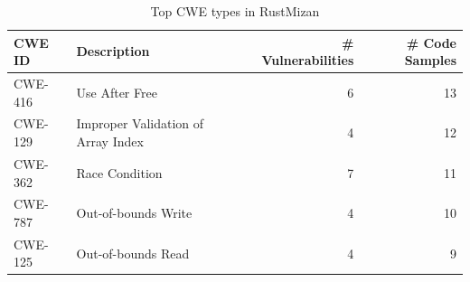 \begin{table}[htbp]
\centering
\footnotesize
\caption{Top CWE types in RustMizan}
\label{tab:cwe_distribution}
\begin{tabular}{@{}llrr@{}}
\toprule
\textbf{CWE ID} & \textbf{Description} & \textbf{\# Vulnerabilities} & \textbf{\# Code Samples} \\
\midrule
CWE-416 & Use After Free & 6 & 13 \\
CWE-129 & Improper Validation of Array Index & 4 & 12 \\
CWE-362 & Race Condition & 7 & 11 \\
CWE-787 & Out-of-bounds Write & 4 & 10 \\
CWE-125 & Out-of-bounds Read & 4 & 9 \\
\bottomrule
\end{tabular}
\end{table}